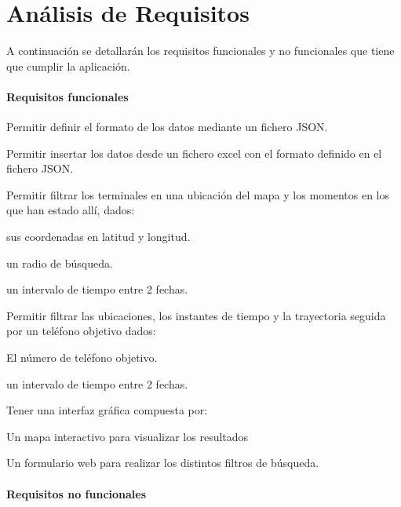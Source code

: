 \section{Análisis de Requisitos\label{SEC:ANALISIS}}
  A continuación se detallarán los requisitos funcionales y no funcionales que tiene que cumplir la aplicación.
  \paragraph{Requisitos funcionales}
  
  \begin{functional}
    \item Permitir definir el formato de los datos mediante un fichero JSON.
    \item Permitir insertar los datos desde un fichero excel con el formato definido en el fichero JSON.
    
    
    \item Permitir filtrar los terminales en una ubicación del mapa y los momentos en los que han estado allí, dados:
    \begin{functional}
      \item sus coordenadas en latitud y longitud.
      \item un radio de búsqueda.
      \item un intervalo de tiempo entre 2 fechas.
    \end{functional}
   
    \item Permitir filtrar las ubicaciones, los instantes de tiempo y la trayectoria seguida por un teléfono objetivo dados:
    \begin{functional}
      \item El número de teléfono objetivo.
      \item un intervalo de tiempo entre 2 fechas.
    \end{functional} 
  
    
    \item Tener una interfaz gráfica compuesta por:
    \begin{functional}
      \item Un mapa interactivo para visualizar los resultados
      \item Un formulario web para realizar los distintos filtros de búsqueda.
    \end{functional}
  \end{functional}
  
  \paragraph{Requisitos no funcionales}
  
